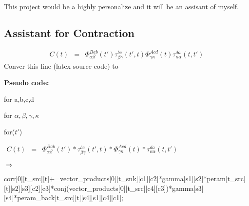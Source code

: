 \documentclass{article}
\begin{document}
This project would be a highly personalize and it will be an assisant of
myself.

\subsection{Assistant for Contraction}


\begin{eqnarray*}
  C (t) & = & \Phi_{\alpha \beta}^{B a b} (t') \tau_{\beta \gamma}^{b c} (t',
  t) \Phi_{\gamma \kappa}^{A c d} (t) \tau_{\kappa \alpha}^{d a} (t, t')
\end{eqnarray*}
Conver this line (latex source code) to

{\bfseries{Pseudo code:}}

for a,b,c,d

for $\alpha, \beta, \gamma, \kappa$

for($t'$)

$\begin{array}{lll}
  C (t) & = & \Phi_{\alpha \beta}^{B a b} (t') \ast \tau_{\beta \gamma}^{b c}
  (t', t) \ast \Phi_{\gamma \kappa}^{A c d} (t) \ast \tau_{\kappa \alpha}^{d
  a} (t, t')
\end{array}$

$\Rightarrow$

corr[0][t\_src][t]+=vector\_products[0][t\_snk][c1][c2]*gamma[s1][s2]*peram[t\_src][t][s2][s3][c2][c3]*conj(vector\_products[0][t\_src][c4][c3])*gamma[s3][s4]*peram\_back[t\_src][t][s4][s1][c4][c1];

\

\
\end{document}
